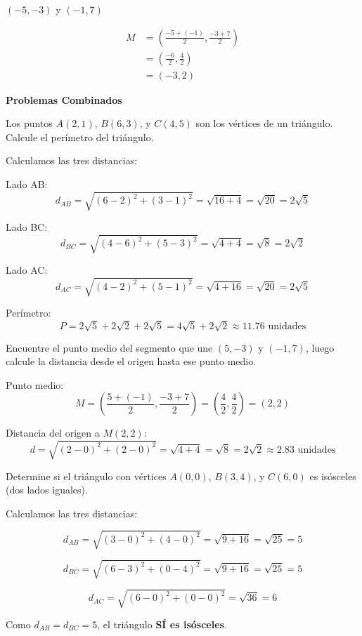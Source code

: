 \begin{exercise}
\problem $(-5, -3)$ y $(-1, 7)$
\begin{solucion}
\begin{align*}
M &= \left(\frac{-5+(-1)}{2}, \frac{-3+7}{2}\right) \\
  &= \left(\frac{-6}{2}, \frac{4}{2}\right) \\
  &= (-3, 2)
\end{align*}
\end{solucion}
\end{exercise}

\begin{exercise}
\textbf{Problemas Combinados}

\problem Los puntos $A(2, 1)$, $B(6, 3)$, y $C(4, 5)$ son los vértices de un triángulo. Calcule el perímetro del triángulo.

\begin{solucion}
Calculamos las tres distancias:

Lado AB:
$$d_{AB} = \sqrt{(6-2)^2 + (3-1)^2} = \sqrt{16+4} = \sqrt{20} = 2\sqrt{5}$$

Lado BC:
$$d_{BC} = \sqrt{(4-6)^2 + (5-3)^2} = \sqrt{4+4} = \sqrt{8} = 2\sqrt{2}$$

Lado AC:
$$d_{AC} = \sqrt{(4-2)^2 + (5-1)^2} = \sqrt{4+16} = \sqrt{20} = 2\sqrt{5}$$

Perímetro:
$$P = 2\sqrt{5} + 2\sqrt{2} + 2\sqrt{5} = 4\sqrt{5} + 2\sqrt{2} \approx 11.76 \text{ unidades}$$
\end{solucion}

\problem Encuentre el punto medio del segmento que une $(5, -3)$ y $(-1, 7)$, luego calcule la distancia desde el origen hasta ese punto medio.

\begin{solucion}
Punto medio:
$$M = \left(\frac{5+(-1)}{2}, \frac{-3+7}{2}\right) = \left(\frac{4}{2}, \frac{4}{2}\right) = (2, 2)$$

Distancia del origen a $M(2,2)$:
$$d = \sqrt{(2-0)^2 + (2-0)^2} = \sqrt{4+4} = \sqrt{8} = 2\sqrt{2} \approx 2.83 \text{ unidades}$$
\end{solucion}

\problem Determine si el triángulo con vértices $A(0, 0)$, $B(3, 4)$, y $C(6, 0)$ es isósceles (dos lados iguales).

\begin{solucion}
Calculamos las tres distancias:

$$d_{AB} = \sqrt{(3-0)^2 + (4-0)^2} = \sqrt{9+16} = \sqrt{25} = 5$$

$$d_{BC} = \sqrt{(6-3)^2 + (0-4)^2} = \sqrt{9+16} = \sqrt{25} = 5$$

$$d_{AC} = \sqrt{(6-0)^2 + (0-0)^2} = \sqrt{36} = 6$$

Como $d_{AB} = d_{BC} = 5$, el triángulo \textbf{SÍ es isósceles}.
\end{solucion}
\end{exercise}

